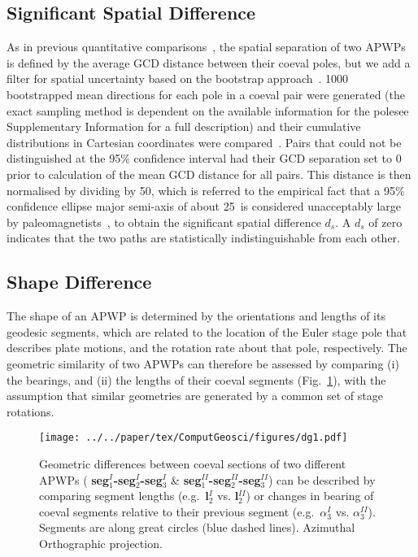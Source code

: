 \subsection{Significant Spatial Difference}\label{sec:sigDs}

As in previous quantitative comparisons~\citep[for example]{S07,T08}, the spatial
separation of two APWPs is defined by the average GCD distance between their
coeval poles, but we add a filter for spatial uncertainty based on the bootstrap
approach~\citep{T91}. 1000 bootstrapped mean directions for each pole in a
coeval pair were generated (the exact sampling method is dependent on the
available information for the pole\textemdash{}see Supplementary Information for
a full description) and their cumulative distributions in Cartesian coordinates
were compared~\citep{T91}. Pairs that could not be distinguished at the
95\% confidence interval had their GCD separation set to 0 prior to calculation
of the mean GCD distance for all pairs. This distance is then normalised by
dividing by 50\degree, which is referred to the empirical fact that a 95\%
confidence ellipse major semi-axis of about 25\degree\ is considered unacceptably
large by paleomagnetists~\citep{B92}, to obtain the significant spatial
difference $d_s$. A $d_s$ of zero indicates that the two paths are statistically
indistinguishable from each other.

\subsection{Shape Difference}

The shape of an APWP is determined by the orientations and lengths of its
geodesic segments, which are related to the location of the Euler stage pole
that describes plate motions, and the rotation rate about that pole,
respectively. The geometric similarity of two APWPs can therefore be assessed
by comparing (i) the bearings, and (ii) the lengths of their coeval segments
(Fig.~\ref{fig:direcdiff}), with the assumption that similar geometries are
generated by a common set of stage rotations.

\begin{figure}[tbp]
\texttt{[image: ../../paper/tex/ComputGeosci/figures/dg1.pdf]}
\caption[Geometric difference definition between two APWPs]{Geometric
differences between coeval sections of two different APWPs ({\bf
seg$_1^I$-seg$_2^I$-seg$_3^I$} \& {\bf seg$_1^{II}$-seg$_2^{II}$-seg$_3^{II}$})
can be described by comparing segment lengths (e.g.\ {\bf l$_2^I$} vs. {\bf
l$_2^{II}$}) or changes in bearing of coeval segments relative to their
previous segment (e.g.\ {\bf $\alpha_3^I$} vs. {\bf $\alpha_3^{II}$}). Segments
are along great circles (blue dashed lines). Azimuthal Orthographic
projection.}\label{fig:direcdiff}
\end{figure}

